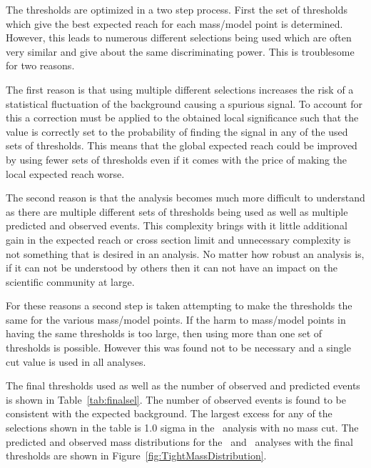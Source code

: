 
The thresholds are optimized in a two step process. First the set of thresholds which give the best expected reach for each mass/model point is determined. However, this leads
to numerous different selections being used which are often very similar and give about the same discriminating power. This is troublesome for two reasons. 

The first reason is that using multiple different selections increases the risk of a statistical fluctuation of the background causing a spurious signal. 
To account for this a correction
must be applied to the obtained local significance such that the value is correctly set to the probability of finding the signal in any of the used sets of thresholds. This
means that the global expected reach could be improved by using fewer sets of thresholds even if it comes with the price of making the local expected reach worse.

The second reason is that the analysis becomes much more difficult to understand as there are multiple different sets of thresholds being used as well as multiple predicted and 
observed events. This complexity brings with it little additional gain in the expected reach or cross section limit and unnecessary complexity is not something that
is desired in an analysis. No matter how robust an analysis is, if it can not be 
understood by others then it can not have an impact on the scientific community at large.

For these reasons a second step is taken attempting to make the thresholds the same for the various mass/model points. If the harm to mass/model points in having the
same thresholds is too large, then using more than one set of thresholds is possible. 
However this was found not to be necessary and a single cut value is used in all analyses. 

The final thresholds used as well as the number of
observed and predicted events is shown in Table~\ref{tab:finalsel}. 
The number of observed events is found to be consistent with the expected background.
The largest excess for any of the selections shown in the table is 1.0 sigma in the \tkonly\ analysis with no mass cut.
The predicted and observed mass distributions for the \tkonly\ and \tktof\ analyses
with the final thresholds are shown in Figure~\ref{fig:TightMassDistribution}. 

